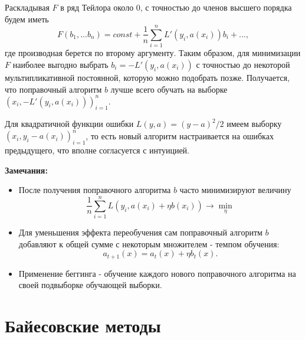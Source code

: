 Раскладывая $F$ в ряд Тейлора около 0, с точностью до членов высшего порядка будем иметь
$$
F(b_1, ... b_n) = const + \frac{1}{n}\sum_{i=1}^nL'(y_i, a(x_i))b_i + ...,
$$
где производная берется по второму аргументу.
Таким образом, для минимизации $F$ наиболее выгодно выбрать $b_i = -L'(y_i, a(x_i))$ с точностью до некоторой мультипликативной постоянной, которую можно подобрать позже. Получается, что поправочный алгоритм $b$ лучше всего обучать на выборке $(x_i, -L'(y_i, a(x_i)))_{i=1}^n$. 

Для квадратичной функции ошибки $L(y, a) = (y - a)^2/2$ имеем выборку $(x_i, y_i - a(x_i))_{i=1}^n$, то есть новый алгоритм настраивается на ошибках предыдущего, что вполне согласуется с интуицией.

\textbf{Замечания:}
\begin{itemize}
    \item После получения поправочного алгоритма $b$ часто минимизируют величину
$$
\frac{1}{n}\sum_{i=1}^nL(y_i, a(x_i) + \eta b(x_i)) \rightarrow \min_\eta
$$
    \item Для уменьшения эффекта переобучения сам поправочный алгоритм $b$ добавляют к общей сумме с некоторым множителем - темпом обучения:
$$
a_{t+1}(x) = a_t(x) + \eta b_t(x).
$$
    \item Применение беггинга - обучение каждого нового поправочного алгоритма на своей подвыборке обучающей выборки.
\end{itemize}


\section{Байесовские методы}



